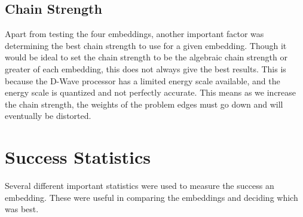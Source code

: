 \documentclass[11pt]{report}
\newcommand{\?}{\stackrel{?}{=}}
\begin{document}
\vspace{10cm}
\subsection{Chain Strength}

Apart from testing the four embeddings, another important factor was determining the best chain strength to use for a given embedding. Though it would be ideal to set the chain strength to be the algebraic chain strength or greater of each embedding, this does not always give the best results. This is because the D-Wave processor has a limited energy scale available, and the energy scale is quantized and not perfectly accurate. This means as we increase the chain strength, the weights of the problem edges must go down and will eventually be distorted.

\section{Success Statistics}
Several different important statistics were used to measure the success an embedding. These were useful in comparing the embeddings and deciding which was best.
\end{document}
